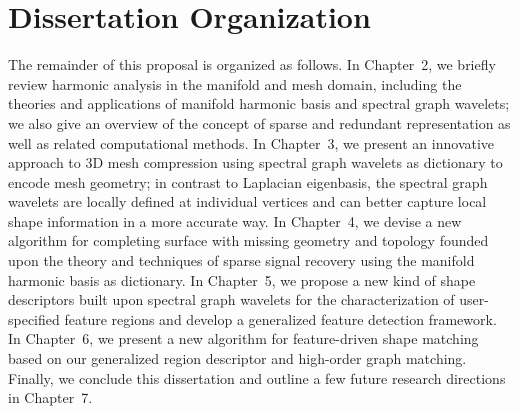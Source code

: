 \section{Dissertation Organization}
The remainder of this proposal is organized as follows.
In Chapter~2, we briefly review harmonic analysis in the manifold and mesh
domain, including the theories and applications of manifold harmonic basis
and spectral graph wavelets; we also give an overview of the concept of
sparse and redundant representation as well as related computational methods.
In Chapter~3, we present an innovative approach to 3D mesh compression
using spectral graph wavelets as dictionary to encode mesh geometry; in
contrast to Laplacian eigenbasis, the spectral graph wavelets are locally
defined at individual vertices and can better capture local shape
information in a more accurate way.
In Chapter~4, we devise a new algorithm for completing surface with missing geometry
and topology founded upon the theory and techniques of sparse signal recovery
using the manifold harmonic basis as dictionary.
In Chapter~5, we propose a new kind of shape descriptors built upon
spectral graph wavelets for the characterization of user-specified feature regions
and develop a generalized feature detection framework.
In Chapter~6, we present a new algorithm for feature-driven shape matching based on
our generalized region descriptor and high-order graph matching. 
Finally, we conclude this dissertation and outline a few future research directions
in Chapter~7.  